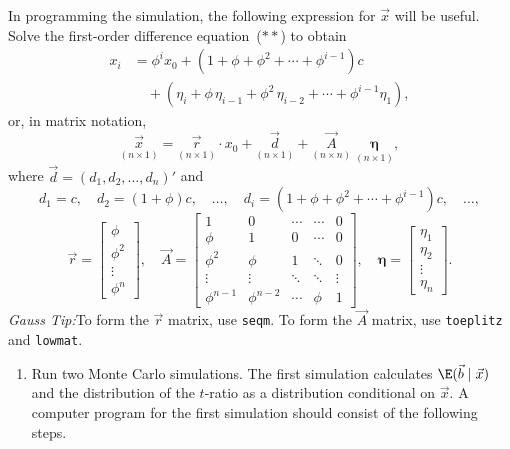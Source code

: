 \begin{problemset}
In programming the simulation, the following expression for $\vec{x}$ will
be useful. Solve the first-order difference equation~($**$) to obtain
%
\begin{align*}
x_i &= \phi^i x_0 + (1 + \phi + \phi^2 + \cdots + \phi^{i-1})c \\
    &\quad + (\eta_i + \phi\,\eta_{i-1} + \phi^2\,\eta_{i-2}
       + \cdots + \phi^{i-1}\eta_1),
\end{align*}
%
or, in matrix notation,
%
\begin{equation}
\underset{(n \times 1)}{\vec{x}}
= \underset{(n \times 1)}{\vec{r}} \cdot x_0
+ \underset{(n \times 1)}{\vec{d}}
+ \underset{(n \times n)}{\vec{A}}\;
  \underset{(n \times 1)}{\bm{\eta}},
\tag{$***$} \label{eq:ps1.mc.stars}
\end{equation}
%
where $\vec{d} = (d_1, d_2, \ldots, d_n)'$ and
%
\[
d_1 = c, \quad d_2 = (1 + \phi)c, \quad \ldots, \quad
d_i = (1 + \phi + \phi^2 + \cdots + \phi^{i-1})c, \quad \ldots,
\]
%
\[
\vec{r} = \begin{bmatrix} \phi \\ \phi^2 \\ \vdots \\ \phi^n \end{bmatrix},
\quad
\vec{A} = \begin{bmatrix}
1         & 0            & \cdots  & \cdots & 0 \\
\phi      & 1            & 0       & \cdots & 0 \\
\phi^2    & \phi         & 1       & \ddots & 0 \\
\vdots    & \vdots       & \ddots  & \ddots & \vdots \\
\phi^{n-1}& \phi^{n-2}   & \cdots  & \phi   & 1
\end{bmatrix},
\quad
\bm{\eta} = \begin{bmatrix} \eta_1 \\ \eta_2 \\ \vdots \\ \eta_n \end{bmatrix}.
\]
%
\textit{Gauss Tip:}\enspace To form the $\vec{r}$ matrix, use \texttt{seqm}.
To form the $\vec{A}$ matrix, use \texttt{toeplitz} and \texttt{lowmat}.

\begin{enumerate}[label=(\alph*)]
\item Run two Monte Carlo simulations. The first simulation calculates
$\E(\vec{b} \mid \vec{x})$ and the distribution of the $t$-ratio as a
distribution conditional on $\vec{x}$. A computer program for the first
simulation should consist of the following steps.


\end{enumerate}
\end{problemset}
